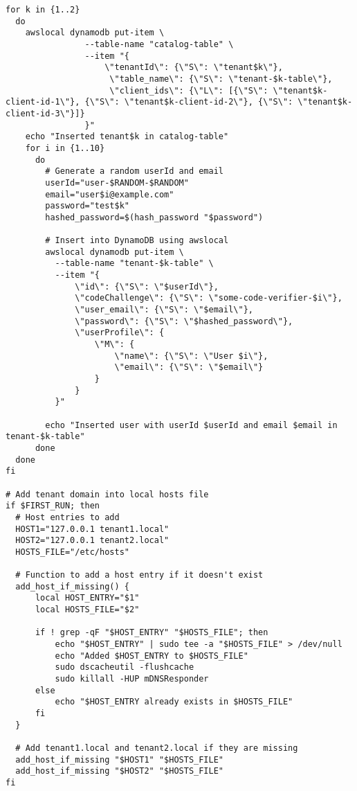 \begin{lstlisting}[style=bashstyle,caption=Build and run script,label=apendix:build_and_run_script]
  for k in {1..2}
  do
    awslocal dynamodb put-item \
                --table-name "catalog-table" \
                --item "{
                    \"tenantId\": {\"S\": \"tenant$k\"},
                     \"table_name\": {\"S\": \"tenant-$k-table\"},
                     \"client_ids\": {\"L\": [{\"S\": \"tenant$k-client-id-1\"}, {\"S\": \"tenant$k-client-id-2\"}, {\"S\": \"tenant$k-client-id-3\"}]}
                }"
    echo "Inserted tenant$k in catalog-table"
    for i in {1..10}
      do
        # Generate a random userId and email
        userId="user-$RANDOM-$RANDOM"
        email="user$i@example.com"
        password="test$k"
        hashed_password=$(hash_password "$password")

        # Insert into DynamoDB using awslocal
        awslocal dynamodb put-item \
          --table-name "tenant-$k-table" \
          --item "{
              \"id\": {\"S\": \"$userId\"},
              \"codeChallenge\": {\"S\": \"some-code-verifier-$i\"},
              \"user_email\": {\"S\": \"$email\"},
              \"password\": {\"S\": \"$hashed_password\"},
              \"userProfile\": {
                  \"M\": {
                      \"name\": {\"S\": \"User $i\"},
                      \"email\": {\"S\": \"$email\"}
                  }
              }
          }"

        echo "Inserted user with userId $userId and email $email in tenant-$k-table"
      done
  done
fi

# Add tenant domain into local hosts file
if $FIRST_RUN; then
  # Host entries to add
  HOST1="127.0.0.1 tenant1.local"
  HOST2="127.0.0.1 tenant2.local"
  HOSTS_FILE="/etc/hosts"

  # Function to add a host entry if it doesn't exist
  add_host_if_missing() {
      local HOST_ENTRY="$1"
      local HOSTS_FILE="$2"

      if ! grep -qF "$HOST_ENTRY" "$HOSTS_FILE"; then
          echo "$HOST_ENTRY" | sudo tee -a "$HOSTS_FILE" > /dev/null
          echo "Added $HOST_ENTRY to $HOSTS_FILE"
          sudo dscacheutil -flushcache
          sudo killall -HUP mDNSResponder
      else
          echo "$HOST_ENTRY already exists in $HOSTS_FILE"
      fi
  }

  # Add tenant1.local and tenant2.local if they are missing
  add_host_if_missing "$HOST1" "$HOSTS_FILE"
  add_host_if_missing "$HOST2" "$HOSTS_FILE"
fi
\end{lstlisting}


